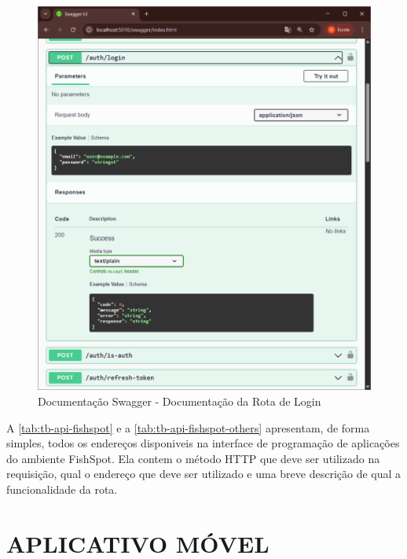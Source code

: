 \begin{figure}[H]
    \centering
    \caption{Documentação Swagger - Documentação da Rota de Login}
    \label{fig:docSwaggerLoginAPI}
    \includegraphics[scale=0.60]{./dados/figuras/swagger-api-login-doc.png}
\end{figure}


\newpage

A \autoref{tab:tb-api-fishspot} e a \autoref{tab:tb-api-fishspot-others} apresentam, de forma simples, todos os endereços disponiveis na interface de programação de aplicações do ambiente FishSpot. Ela contem o método HTTP que deve ser utilizado na requisição, qual o endereço que deve ser utilizado e uma breve descrição de qual a funcionalidade da rota.





\newpage

\section{APLICATIVO MÓVEL}
\label{sec:desenvolvimentodoapp}

